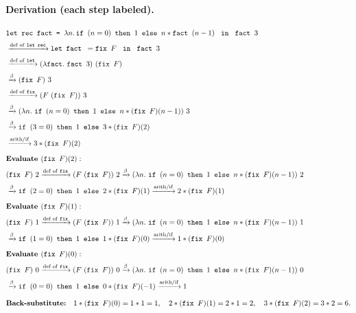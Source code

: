 \documentclass{article}
\theoremstyle{theorem}
\theoremstyle{definition}
\theoremstyle{remark}
\begin{document}
\paragraph{Derivation (each step labeled).}
\begin{align*}
&\texttt{let rec fact = }\lambda n.\,\texttt{if }(n=0)\texttt{ then }1\texttt{ else }n * \texttt{fact }(n-1)\ \texttt{ in }\ \texttt{fact }3
\\[2pt]
&\xrightarrow{\text{def of \texttt{let rec}}}
\texttt{let fact }= \texttt{fix }F\ \texttt{ in }\ \texttt{fact }3
\\[2pt]
&\xrightarrow{\text{def of \texttt{let}}}
(\lambda \texttt{fact}.\ \texttt{fact }3)\ (\texttt{fix }F)
\\[2pt]
&\xrightarrow{\beta}
(\texttt{fix }F)\ 3
\\[2pt]
&\xrightarrow{\text{def of \texttt{fix}}}
(F\ (\texttt{fix }F))\ 3
\\[2pt]
&\xrightarrow{\beta}
(\lambda n.\ \texttt{if }(n=0)\texttt{ then }1\texttt{ else }n * (\texttt{fix }F)(n-1))\ 3
\\[2pt]
&\xrightarrow{\beta}
\texttt{if }(3=0)\texttt{ then }1\texttt{ else }3 * (\texttt{fix }F)(2)
\\[2pt]
&\xrightarrow{\text{arith/if}}
3 * (\texttt{fix }F)(2)
\\[6pt]
&\textbf{Evaluate }(\texttt{fix }F)(2):
\\[2pt]
&(\texttt{fix }F)\ 2
\xrightarrow{\text{def of \texttt{fix}}}
(F\ (\texttt{fix }F))\ 2
\xrightarrow{\beta}
(\lambda n.\ \texttt{if }(n=0)\texttt{ then }1\texttt{ else }n * (\texttt{fix }F)(n-1))\ 2
\\[2pt]
&\xrightarrow{\beta}
\texttt{if }(2=0)\texttt{ then }1\texttt{ else }2 * (\texttt{fix }F)(1)
\xrightarrow{\text{arith/if}}
2 * (\texttt{fix }F)(1)
\\[6pt]
&\textbf{Evaluate }(\texttt{fix }F)(1):
\\[2pt]
&(\texttt{fix }F)\ 1
\xrightarrow{\text{def of \texttt{fix}}}
(F\ (\texttt{fix }F))\ 1
\xrightarrow{\beta}
(\lambda n.\ \texttt{if }(n=0)\texttt{ then }1\texttt{ else }n * (\texttt{fix }F)(n-1))\ 1
\\[2pt]
&\xrightarrow{\beta}
\texttt{if }(1=0)\texttt{ then }1\texttt{ else }1 * (\texttt{fix }F)(0)
\xrightarrow{\text{arith/if}}
1 * (\texttt{fix }F)(0)
\\[6pt]
&\textbf{Evaluate }(\texttt{fix }F)(0):
\\[2pt]
&(\texttt{fix }F)\ 0
\xrightarrow{\text{def of \texttt{fix}}}
(F\ (\texttt{fix }F))\ 0
\xrightarrow{\beta}
(\lambda n.\ \texttt{if }(n=0)\texttt{ then }1\texttt{ else }n * (\texttt{fix }F)(n-1))\ 0
\\[2pt]
&\xrightarrow{\beta}
\texttt{if }(0=0)\texttt{ then }1\texttt{ else }0 * (\texttt{fix }F)(-1)
\xrightarrow{\text{arith/if}}
1
\\[8pt]
&\textbf{Back-substitute:}\quad
1 * (\texttt{fix }F)(0) = 1 * 1 = 1,\quad
2 * (\texttt{fix }F)(1) = 2 * 1 = 2,\quad
3 * (\texttt{fix }F)(2) = 3 * 2 = 6.
\end{align*}
\end{document}
